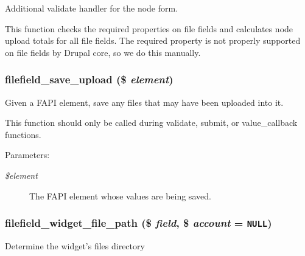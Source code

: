 Additional validate handler for the node form.

This function checks the required properties on file fields and calculates node upload totals for all file fields. The required property is not properly supported on file fields by Drupal core, so we do this manually. \hypertarget{filefield__widget_8inc_d24461bcec49edffb02fec77e15c85f2}{
\subsubsection[{filefield\_\-save\_\-upload}]{\setlength{\rightskip}{0pt plus 5cm}filefield\_\-save\_\-upload (\$ {\em element})}}
\label{filefield__widget_8inc_d24461bcec49edffb02fec77e15c85f2}


Given a FAPI element, save any files that may have been uploaded into it.

This function should only be called during validate, submit, or value\_\-callback functions.

\begin{Desc}
\item[Parameters:]
\begin{description}
\item[{\em \$element}]The FAPI element whose values are being saved. \end{description}
\end{Desc}
\hypertarget{filefield__widget_8inc_0f015f9e3d585ea916f6fb8999543043}{
\subsubsection[{filefield\_\-widget\_\-file\_\-path}]{\setlength{\rightskip}{0pt plus 5cm}filefield\_\-widget\_\-file\_\-path (\$ {\em field}, \/  \$ {\em account} = {\tt NULL})}}
\label{filefield__widget_8inc_0f015f9e3d585ea916f6fb8999543043}


Determine the widget's files directory

